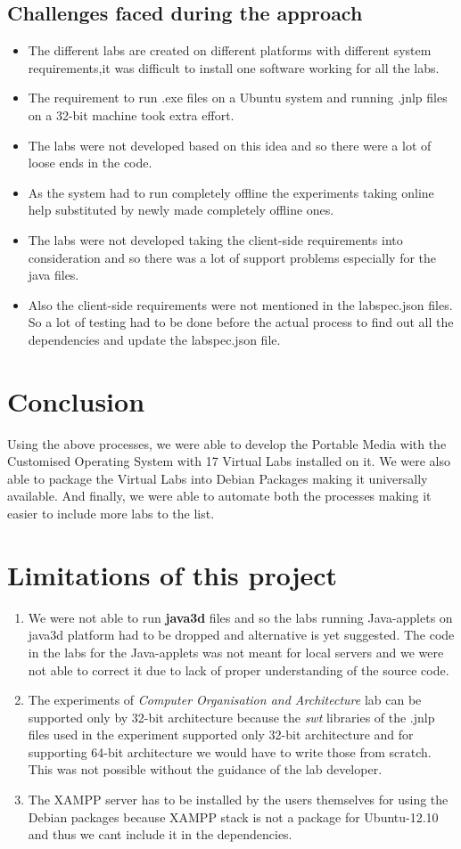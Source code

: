 \documentclass[conference]{IEEEtran}
\begin{document}
  \subsection{Challenges faced during the approach}
  \begin{itemize}
    \item The different labs are created on different platforms with different system requirements,it was difficult to install one software working for all the labs.
    \item The requirement to run .exe files on a Ubuntu system and running .jnlp files on a 32-bit machine took extra effort.
    \item The labs were not developed based on this idea and so there were a lot of loose ends in the code.
    \item As the system had to run completely offline the experiments taking online help substituted by newly made completely offline ones.
    \item The labs were not developed taking the client-side requirements into consideration and so there was a lot of support problems especially for the java files.
    \item Also the client-side requirements were not mentioned in the labspec.json files. So a lot of testing had to be done before the actual process to find out all the dependencies and update the labspec.json file. 
  \end{itemize}
\section{Conclusion}
Using the above processes, we were able to develop the Portable Media with the Customised Operating System with 17 Virtual Labs installed on it. We were also able to package the Virtual Labs into Debian Packages making it universally available. And finally, we were able to automate both the processes making it easier to include more labs to the list.  
\section{Limitations of this project}
\begin{enumerate}
  \item We were not able to run \textbf{java3d} files and so the labs running Java-applets on java3d platform had to be dropped and  alternative is yet suggested. The code in the labs for the Java-applets was not meant for local servers and we were not able to correct it due to lack of proper understanding of the source code.
  \item The experiments of \textit{Computer Organisation and Architecture} lab can be supported only by 32-bit architecture because the \textit{swt} libraries of the .jnlp files used in the experiment supported only 32-bit architecture and for supporting 64-bit architecture we would have to write those from scratch. This was not possible without the guidance of the lab developer.
  \item The XAMPP server has to be installed by the users themselves for using the Debian packages because XAMPP stack is not a package for Ubuntu-12.10 and thus we cant include it in the dependencies.   
\end{enumerate}
\end{document}
